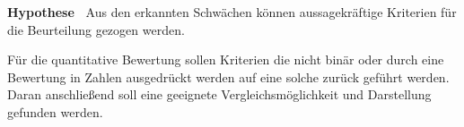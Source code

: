 \textbf{Hypothese~} Aus den erkannten Schwächen können aussagekräftige Kriterien für die Beurteilung gezogen werden.

Für die quantitative Bewertung sollen Kriterien die nicht binär oder durch eine Bewertung in Zahlen ausgedrückt werden auf eine solche zurück geführt werden.
Daran anschließend soll eine geeignete Vergleichsmöglichkeit und Darstellung gefunden werden.



%

%

%











